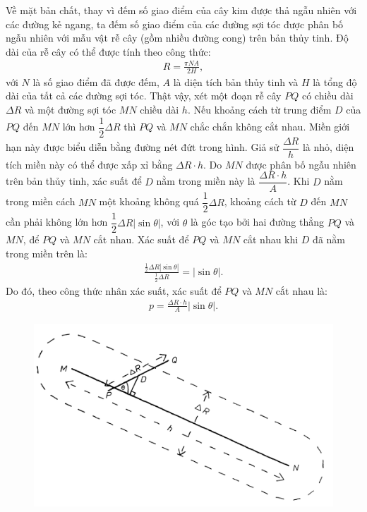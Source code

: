 \begin{multicols}{2}
\begin{figure}[H]
		\vspace*{-10pt}
	\end{figure}
	Về mặt bản chất, thay vì đếm số giao điểm của cây kim được thả ngẫu nhiên với các đường kẻ ngang, ta đếm số giao điểm của các đường sợi tóc được phân bố ngẫu nhiên với mẫu vật rễ cây (gồm nhiều đường cong) trên bản thủy tinh.
	\vskip 0.1cm
	Độ dài của rễ cây có thể được tính theo công thức:
	\begin{align*}
		R= \frac{\pi N A}{2H},	\tag{$4$}
	\end{align*}
	với $N$ là số giao điểm đã được đếm, $A$ là diện tích bản thủy tinh và $H$ là tổng độ dài của tất cả các đường sợi tóc.
	\vskip 0.1cm
	Thật vậy, xét một đoạn rễ cây $PQ$ có chiều dài $\Delta R$ và một đường sợi tóc $MN$ chiều dài $h$. Nếu khoảng cách từ trung điểm $D$ của $PQ$ đến $MN$ lớn hơn $\dfrac{1}{2}\Delta R$ thì $PQ$ và $MN$ chắc chắn không cắt nhau. Miền giới hạn này được biểu diễn bằng đường nét đứt trong hình. Giả sử $\dfrac{\Delta R}{h}$ là nhỏ, diện tích miền này có thể được xấp xỉ bằng $\Delta R \cdot h$. Do $MN$ được phân bố ngẫu nhiên trên bản thủy tinh, xác suất để $D$ nằm trong miền này là $\dfrac{\Delta R \cdot h}{A}$.
	\vskip 0.1cm
	Khi $D$ nằm trong miền cách $MN$ một khoảng không quá $\dfrac{1}{2}\Delta R$, khoảng cách từ $D$ đến $MN$ cần phải không lớn hơn $\dfrac{1}{2}\Delta R |\sin \theta |$, với $\theta$ là góc tạo bởi hai đường thẳng $PQ$ và $MN$, để $PQ$ và $MN$ cắt nhau. Xác suất để $PQ$ và $MN$ cắt nhau khi $D$ đã nằm trong miền trên là:
	\begin{align*}
		\frac{\frac{1}{2}\Delta R|\sin\theta|}{\frac{1}{2}\Delta R} = |\sin\theta|.
	\end{align*}
	Do đó, theo công thức nhân xác suất, xác suất để $PQ$ và $MN$ cắt nhau là:
	\begin{align*}
		p = \frac{\Delta R\cdot h}{A} |\sin\theta|.
	\end{align*}
	\begin{figure}[H]
		\vspace*{-5pt}
		\centering
		\captionsetup{labelformat= empty, justification=centering}
		\includegraphics[width=1\linewidth]{9}

\end{figure}
\end{multicols}
